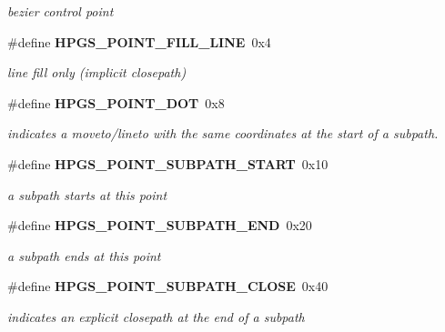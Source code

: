 \begin{DoxyCompactItemize}
\begin{DoxyCompactList}\small\item\em bezier control point \item\end{DoxyCompactList}\item 
\#define {\bf HPGS\_\-POINT\_\-FILL\_\-LINE}~0x4\label{group__path_ga0f1ad714cd387f5808fd99fb26a145cc}

\begin{DoxyCompactList}\small\item\em line fill only (implicit closepath) \item\end{DoxyCompactList}\item 
\#define {\bf HPGS\_\-POINT\_\-DOT}~0x8\label{group__path_gaf33f767f7b5b8849d65a0e6988386f14}

\begin{DoxyCompactList}\small\item\em indicates a moveto/lineto with the same coordinates at the start of a subpath. \item\end{DoxyCompactList}\item 
\#define {\bf HPGS\_\-POINT\_\-SUBPATH\_\-START}~0x10\label{group__path_ga701397585f03b6cd04df91f618919bb6}

\begin{DoxyCompactList}\small\item\em a subpath starts at this point \item\end{DoxyCompactList}\item 
\#define {\bf HPGS\_\-POINT\_\-SUBPATH\_\-END}~0x20\label{group__path_ga7fa10e914aeb28a8de35407e16e702ae}

\begin{DoxyCompactList}\small\item\em a subpath ends at this point \item\end{DoxyCompactList}\item 
\#define {\bf HPGS\_\-POINT\_\-SUBPATH\_\-CLOSE}~0x40\label{group__path_ga8b553718c2918f34ff13305103cbc4c5}

\begin{DoxyCompactList}\small\item\em indicates an explicit closepath at the end of a subpath \item\end{DoxyCompactList}\end{DoxyCompactItemize}
